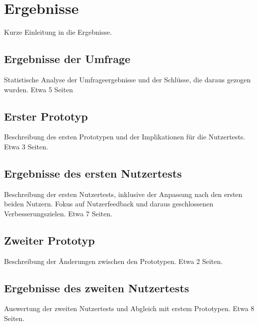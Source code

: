 \chapter{Ergebnisse} %
Kurze Einleitung in die Ergebnisse.

\section{Ergebnisse der Umfrage} %
Statistische Analyse der Umfrageergebnisse und der Schlüsse, die daraus gezogen wurden.
Etwa 5 Seiten

\section{Erster Prototyp} %
Beschreibung des ersten Prototypen und der Implikationen für die Nutzertests. 
Etwa 3 Seiten.

\section{Ergebnisse des ersten Nutzertests} %
Beschreibung der ersten Nutzertests, inklusive der Anpassung nach den ersten beiden Nutzern. 
Fokus auf Nutzerfeedback und daraus geschlossenen Verbesserungszielen.
Etwa 7 Seiten.

\section{Zweiter Prototyp} %
Beschreibung der Änderungen zwischen den Prototypen.
Etwa 2 Seiten.

\section{Ergebnisse des zweiten Nutzertests} %
Auswertung der zweiten Nutzertests und Abgleich mit erstem Prototypen.
Etwa 8 Seiten.